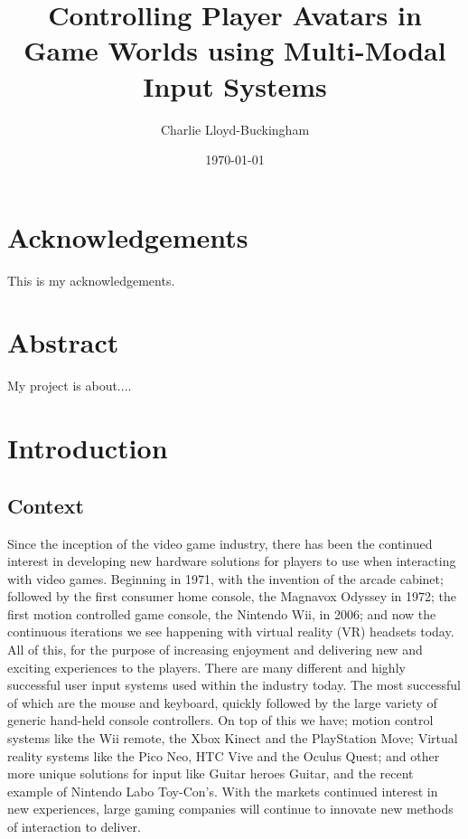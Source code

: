 \documentclass[11pt, a4paper]{article}
\title{Controlling Player Avatars in Game Worlds using Multi-Modal Input Systems}
\author{Charlie Lloyd-Buckingham}
\date{\today}
\begin{document}
\maketitle



\pagebreak
\section{Acknowledgements}	
This is my acknowledgements.

\section{Abstract}	
My project is about....



\pagebreak
\tableofcontents				%



\pagebreak
\section{Introduction}	
\subsection{Context}
Since the inception of the video game industry, there has been the continued interest in developing new hardware solutions for players to use when interacting with video games. Beginning in 1971, with the invention of the arcade cabinet; followed by the first consumer home console, the Magnavox Odyssey in 1972; the first motion controlled game console, the Nintendo Wii, in 2006; and now the continuous iterations we see happening with virtual reality (VR) headsets today. All of this, for the purpose of increasing enjoyment and delivering new and exciting experiences to the players. There are many different and highly successful user input systems used within the industry today. The most successful of which are the mouse and keyboard, quickly followed by the large variety of generic hand-held console controllers. On top of this we have; motion control systems like the Wii remote, the Xbox Kinect and the PlayStation Move; Virtual reality systems like the Pico Neo, HTC Vive and the Oculus Quest; and other more unique solutions for input like Guitar heroes Guitar, and the recent example of Nintendo Labo Toy-Con's. With the markets continued interest in new experiences, large gaming companies will continue to innovate new methods of interaction to deliver.
\end{document}
